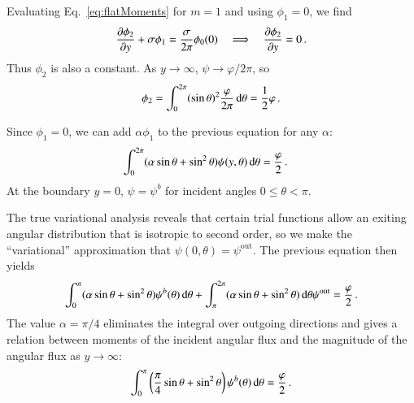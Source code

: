 \documentclass{anstrans}
\begin{document}
Evaluating Eq.~\eqref{eq:flatMoments} for $m=1$ and using
$\phi_{1}=0$, we find
\begin{equation*}
  \frac{\partial \phi_{2}}{\partial y}
  + \sigma \phi_{1}
  = \frac{\sigma}{2\pi} \phi_{0} (0)
  \quad \Longrightarrow \quad
  \frac{\partial \phi_{2}}{\partial y} = 0\,.
\end{equation*}
Thus $\phi_{2}$ is also a constant. As $y\to\infty$, $\psi\to\varphi/2\pi$, so
\begin{equation*}
  \phi_{2} = \int_{0}^{2\pi} (\sin\theta)^2 \frac{\varphi}{2\pi} \mathop{}\!\mathrm{d}\theta
  = \frac{1}{2} \varphi\,.
\end{equation*}

Since $\phi_1=0$, we can add $\alpha \phi_1$ to the previous equation for any
$\alpha$:
\begin{align*}
 \int_{0}^{2\pi} (\alpha \sin\theta + \sin^2\theta)
 \psi(y,\theta) \mathop{}\!\mathrm{d}\theta
 &= \frac{\varphi}{2}\,.
\end{align*}
At the boundary $y=0$, $\psi=\psi^b$ for incident angles $0 \le \theta < \pi$.

The true variational analysis reveals that certain trial functions
allow an exiting angular distribution that is isotropic to second order, so
we make the ``variational'' approximation that $\psi(0,\theta)=\psi^\text{out}$.
The previous equation then yields
\begin{equation*}
 \int_{0}^{\pi} (\alpha \sin\theta + \sin^2\theta)
 \psi^b(\theta) \mathop{}\!\mathrm{d}\theta
 + \int_{\pi}^{2\pi} (\alpha \sin\theta + \sin^2\theta)\mathop{}\!\mathrm{d}\theta \psi^\text{out}
 = \frac{\varphi}{2}\,.
\end{equation*}
The value $\alpha=\pi/4$ eliminates the integral over outgoing directions and
gives a relation between moments of the incident angular flux and the
magnitude of the angular flux as $y\to\infty$:
\begin{equation}\label{eq:varBoundary}
  \int_{0}^{\pi} \left( \frac{\pi}{4} \sin\theta + \sin^2\theta \right)
 \psi^b(\theta) \mathop{}\!\mathrm{d}\theta
 = \frac{\varphi}{2}\,.
\end{equation}
\end{document}
